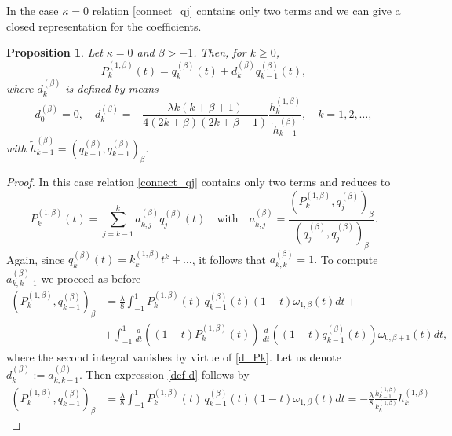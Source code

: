 \documentclass{amsart}
\theoremstyle{plain}%
\newtheorem{prop}[thm]{Proposition}
\theoremstyle{definition}
\theoremstyle{remark}
\begin{document}
In the case \(\kappa = 0\) relation \eqref{connect_qj} contains only two terms and we can give a closed representation for the coefficients.

\begin{prop}
Let \(\kappa = 0\) and \(\beta >-1\). Then, for $k\ge 0$, 
\begin{equation}\label{1-2-one-v}
P_k^{(1, \beta)}(t) = q_k^{(\beta)}(t) + d_{k}^{(\beta)}q_{k-1}^{(\beta)}(t),
\end{equation}
where $d_k^{(\beta)}$ is defined by means
\begin{equation}\label{def-d}
d_{0}^{(\beta)}=0, \quad d_{k}^{(\beta)} = - \frac{\lambda k (k + \beta+1)}{4(2 k + \beta) ( 2 k + \beta+1)}\frac{h_{k}^{(1,\beta)}}{\widetilde h_{k-1}^{(\beta)}},\quad k = 1,2, \ldots, 
\end{equation}
with \(\widetilde h_{k-1}^{(\beta)} = (q_{k-1}^{(\beta)},q_{k-1}^{(\beta)})_{\beta}\). 
\end{prop}

\begin{proof}
In this case relation \eqref{connect_qj} contains only two terms and reduces to 
\[
P_{k}^{(1, \beta)}(t) = \sum_{j=k-1}^k  a^{(\beta)}_{k,j} q_j^{(\beta)}(t) \quad \text{with}\quad
    a^{(\beta)}_{k,j} = \frac{(P_{k}^{(1, \beta)}, q_j^{(\beta)})_{\beta} } { (q_{j}^{(\beta)},q_{j}^{(\beta)})_{\beta} }.
\]
Again, since $q_k^{(\beta)}(t) = k_k^{(1,{\beta})}t^k + \ldots$, it follows that  $a^{(\beta)}_{k,k} = 1.$
To compute $a^{(\beta)}_{k,k-1}$ we proceed as before
\begin{align*}
(P_{k}^{(1, \beta)}, q_{k-1}^{(\beta)})_{\beta} &= \frac{\lambda}{8} \int_{-1}^1
P_{k}^{(1, \beta)}(t)\, q_{k-1}^{(\beta)}(t)(1-t) \omega_{1,\beta}(t) dt + \nonumber\\
& + \int_{-1}^1 \frac{d}{dt}\left((1-t)P_{k}^{(1, \beta)}(t)\right)\, \frac{d}{dt}\left((1-t)q_{k-1}^{(\beta)}(t)\right) \omega_{0,\beta+1}(t) dt, 
\end{align*}
where the second integral vanishes by virtue of \eqref{d_Pk}. Let us denote \(d_{k}^{(\beta)}:= a^{(\beta)}_{k,k-1}\). Then expression \eqref{def-d} follows by 
\begin{align*}
(P_{k}^{(1, \beta)}, q_{k-1}^{(\beta)})_{\beta} &= \frac{\lambda}{8} \int_{-1}^1
P_{k}^{(1, \beta)}(t)\, q_{k-1}^{(\beta)}(t)(1-t) \omega_{1,\beta}(t) dt   = - \frac{\lambda}{8} \frac{k_{k-1}^{(1,\beta)}}{k_{k}^{(1,\beta)}}h_{k}^{(1,\beta)}
\end{align*}
\end{proof}
\end{document}
